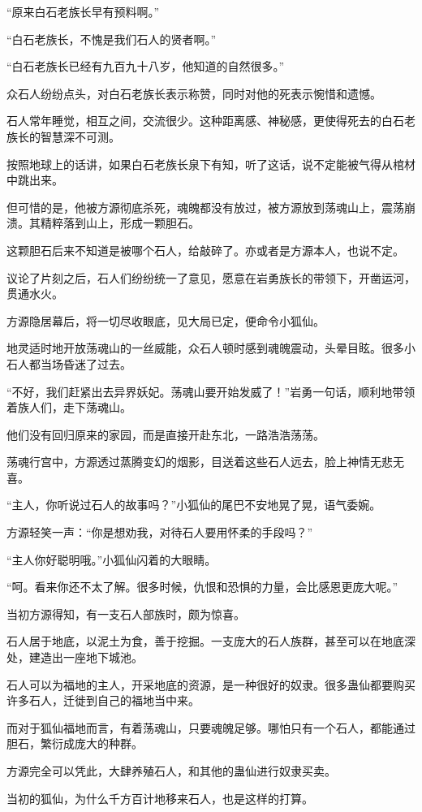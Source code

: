 \begin{this_body}
“原来白石老族长早有预料啊。”

“白石老族长，不愧是我们石人的贤者啊。”

“白石老族长已经有九百九十八岁，他知道的自然很多。”

众石人纷纷点头，对白石老族长表示称赞，同时对他的死表示惋惜和遗憾。

石人常年睡觉，相互之间，交流很少。这种距离感、神秘感，更使得死去的白石老族长的智慧深不可测。

按照地球上的话讲，如果白石老族长泉下有知，听了这话，说不定能被气得从棺材中跳出来。

但可惜的是，他被方源彻底杀死，魂魄都没有放过，被方源放到荡魂山上，震荡崩溃。其精粹落到山上，形成一颗胆石。

这颗胆石后来不知道是被哪个石人，给敲碎了。亦或者是方源本人，也说不定。

议论了片刻之后，石人们纷纷统一了意见，愿意在岩勇族长的带领下，开凿运河，贯通水火。

方源隐居幕后，将一切尽收眼底，见大局已定，便命令小狐仙。

地灵适时地开放荡魂山的一丝威能，众石人顿时感到魂魄震动，头晕目眩。很多小石人都当场昏迷了过去。

“不好，我们赶紧出去异界妖妃。荡魂山要开始发威了！”岩勇一句话，顺利地带领着族人们，走下荡魂山。

他们没有回归原来的家园，而是直接开赴东北，一路浩浩荡荡。

荡魂行宫中，方源透过蒸腾变幻的烟影，目送着这些石人远去，脸上神情无悲无喜。

“主人，你听说过石人的故事吗？”小狐仙的尾巴不安地晃了晃，语气委婉。

方源轻笑一声：“你是想劝我，对待石人要用怀柔的手段吗？”

“主人你好聪明哦。”小狐仙闪着的大眼睛。

“呵。看来你还不太了解。很多时候，仇恨和恐惧的力量，会比感恩更庞大呢。”

当初方源得知，有一支石人部族时，颇为惊喜。

石人居于地底，以泥土为食，善于挖掘。一支庞大的石人族群，甚至可以在地底深处，建造出一座地下城池。

石人可以为福地的主人，开采地底的资源，是一种很好的奴隶。很多蛊仙都要购买许多石人，迁徙到自己的福地当中来。

而对于狐仙福地而言，有着荡魂山，只要魂魄足够。哪怕只有一个石人，都能通过胆石，繁衍成庞大的种群。

方源完全可以凭此，大肆养殖石人，和其他的蛊仙进行奴隶买卖。

当初的狐仙，为什么千方百计地移来石人，也是这样的打算。


\end{this_body}
